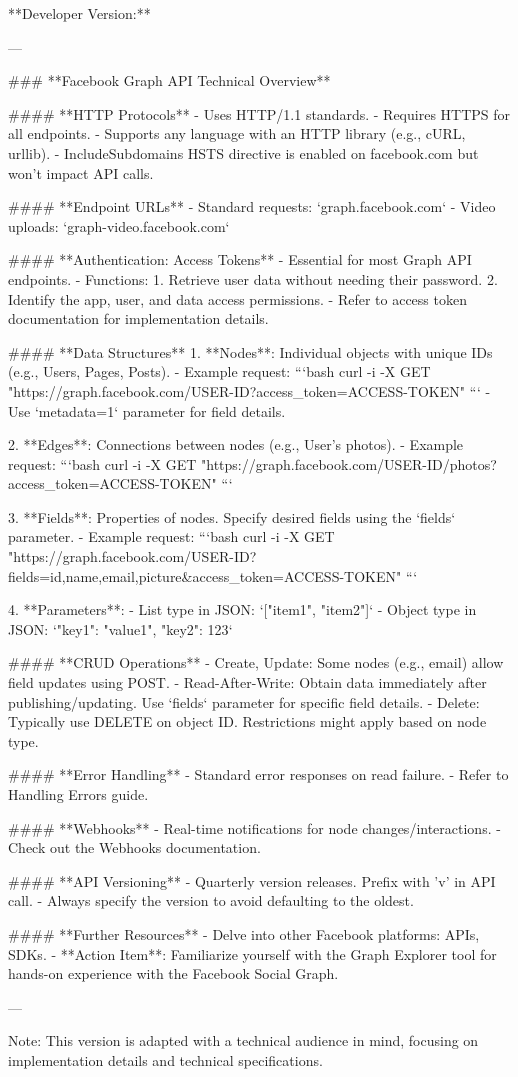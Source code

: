 **Developer Version:**

---

### **Facebook Graph API Technical Overview**

#### **HTTP Protocols**
- Uses HTTP/1.1 standards.
- Requires HTTPS for all endpoints.
- Supports any language with an HTTP library (e.g., cURL, urllib).
- IncludeSubdomains HSTS directive is enabled on facebook.com but won't impact API calls.

#### **Endpoint URLs**
- Standard requests: `graph.facebook.com`
- Video uploads: `graph-video.facebook.com`

#### **Authentication: Access Tokens**
- Essential for most Graph API endpoints.
- Functions:
  1. Retrieve user data without needing their password.
  2. Identify the app, user, and data access permissions.
- Refer to access token documentation for implementation details.

#### **Data Structures**
1. **Nodes**: Individual objects with unique IDs (e.g., Users, Pages, Posts).
   - Example request: 
     ```bash
     curl -i -X GET "https://graph.facebook.com/USER-ID?access_token=ACCESS-TOKEN"
     ```
   - Use `metadata=1` parameter for field details.
  
2. **Edges**: Connections between nodes (e.g., User's photos).
   - Example request: 
     ```bash
     curl -i -X GET "https://graph.facebook.com/USER-ID/photos?access_token=ACCESS-TOKEN"
     ```

3. **Fields**: Properties of nodes. Specify desired fields using the `fields` parameter.
   - Example request: 
     ```bash
     curl -i -X GET "https://graph.facebook.com/USER-ID?fields=id,name,email,picture&access_token=ACCESS-TOKEN"
     ```

4. **Parameters**:
   - List type in JSON: `["item1", "item2"]`
   - Object type in JSON: `{"key1": "value1", "key2": 123}`

#### **CRUD Operations**
- Create, Update: Some nodes (e.g., email) allow field updates using POST.
- Read-After-Write: Obtain data immediately after publishing/updating. Use `fields` parameter for specific field details.
- Delete: Typically use DELETE on object ID. Restrictions might apply based on node type.

#### **Error Handling**
- Standard error responses on read failure.
- Refer to Handling Errors guide.

#### **Webhooks**
- Real-time notifications for node changes/interactions.
- Check out the Webhooks documentation.

#### **API Versioning**
- Quarterly version releases. Prefix with 'v' in API call.
- Always specify the version to avoid defaulting to the oldest.

#### **Further Resources**
- Delve into other Facebook platforms: APIs, SDKs.
- **Action Item**: Familiarize yourself with the Graph Explorer tool for hands-on experience with the Facebook Social Graph.

---

Note: This version is adapted with a technical audience in mind, focusing on implementation details and technical specifications.